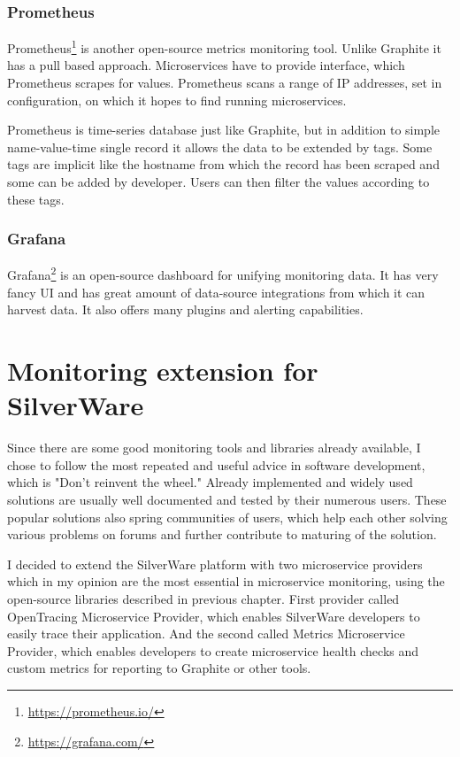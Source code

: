 \documentclass[12pt,oneside]{fithesis2}
\begin{document}
\subsection{Prometheus}

Prometheus\footnote{\url{https://prometheus.io/}} is another open-source metrics monitoring tool. Unlike Graphite it has a pull based approach. Microservices have to provide interface, which Prometheus scrapes for values. Prometheus scans a range of IP addresses, set in configuration, on which it hopes to find running microservices.

Prometheus is time-series database just like Graphite, but in addition to simple name-value-time single record it allows the data to be extended by tags. Some tags are implicit like the hostname from which the record has been scraped and some can be added by developer. Users can then filter the values according to these tags.

\subsection{Grafana}

Grafana\footnote{\url{https://grafana.com/}} is an open-source dashboard for unifying monitoring data. It has very fancy UI and has great amount of data-source integrations from which it can harvest data. It also offers many plugins and alerting capabilities.

\chapter{Monitoring extension for SilverWare}

Since there are some good monitoring tools and libraries already available, I chose to follow the most repeated and useful advice in software development, which is "Don't reinvent the wheel." Already implemented and widely used solutions are usually well documented and tested by their numerous users. These popular solutions also spring communities of users, which help each other solving various problems on forums and further contribute to maturing of the solution.

I decided to extend the SilverWare platform with two microservice providers which in my opinion are the most essential in microservice monitoring, using the open-source libraries described in previous chapter. First provider called OpenTracing Microservice Provider, which enables SilverWare developers to easily trace their application. And the second called Metrics Microservice Provider, which enables developers to create microservice health checks and custom metrics for reporting to Graphite or other tools.
\end{document}
